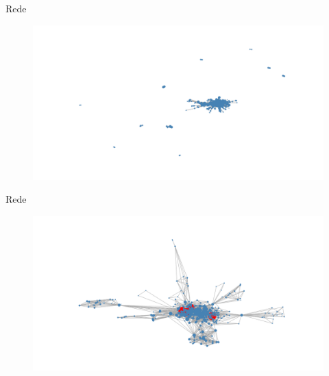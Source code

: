 \documentclass{beamer}
\begin{document}
\begin{frame}{Rede}
\begin{figure}
    \centering
    \includegraphics[scale = 0.3]{img/graph.png}
\end{figure}
\end{frame}

\begin{frame}{Rede}
\begin{figure}
    \centering
    \includegraphics[scale = 0.3]{img/graph2.png}
\end{figure}
\end{frame}
\end{document}
